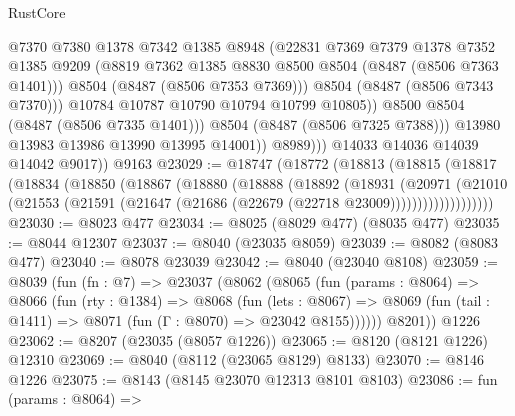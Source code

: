 \begin{lexlean}{RustCore}
\begin{coremodule}
                            @7370
                            @7380
                            @1378
                            @7342
                            @1385
                            @8948
                            (@22831
                              @7369
                              @7379
                              @1378
                              @7352
                              @1385
                              @9209
                              (@8819 @7362 @1385 @8830 @8500 @8504 (@8487 (@8506 @7363 @1401)))
                              @8504
                              (@8487 (@8506 @7353 @7369)))
                            @8504
                            (@8487 (@8506 @7343 @7370)))
                          @10784
                          @10787
                          @10790
                          @10794
                          @10799
                          @10805))
                      @8500
                      @8504
                      (@8487 (@8506 @7335 @1401)))
                    @8504
                    (@8487 (@8506 @7325 @7388)))
                  @13980
                  @13983
                  @13986
                  @13990
                  @13995
                  @14001))
              @8989)))
        @14033
        @14036
        @14039
        @14042
        @9017))
    @9163
@23029 := @18747
    (@18772
      (@18813
        (@18815
          (@18817
            (@18834
              (@18850
                (@18867
                  (@18880
                    (@18888
                      (@18892
                        (@18931
                          (@20971
                            (@21010
                              (@21553
                                (@21591 (@21647 (@21686 (@22679 (@22718 @23009)))))))))))))))))))
@23030 := @8023 @477
@23034 := @8025 (@8029 @477) (@8035 @477)
@23035 := @8044 @12307
@23037 := @8040 (@23035 @8059)
@23039 := @8082 (@8083 @477)
@23040 := @8078 @23039
@23042 := @8040 (@23040 @8108)
@23059 := @8039
    (fun (fn : @7) =>
    @23037
      (@8062
        (@8065
          (fun (params : @8064) =>
          @8066
            (fun (rty : @1384) =>
            @8068
              (fun (lets : @8067) =>
              @8069 (fun (tail : @1411) => @8071 (fun (Γ : @8070) => @23042 @8155))))))
        @8201))
    @1226
@23062 := @8207 (@23035 (@8057 @1226))
@23065 := @8120 (@8121 @1226) @12310
@23069 := @8040 (@8112 (@23065 @8129) @8133)
@23070 := @8146 @1226
@23075 := @8143 (@8145 @23070 @12313 @8101 @8103)
@23086 := fun (params : @8064) =>

\end{coremodule}
\end{lexlean}
